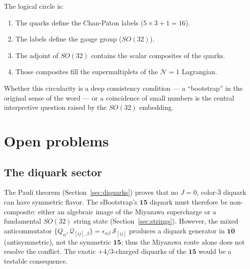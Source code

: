 \documentclass[12pt,a4paper]{article}
\begin{document}
The logical circle is:
\begin{enumerate}
\item The quarks define the Chan-Paton labels ($5 \times 3 + 1 = 16$).
\item The labels define the gauge group ($SO(32)$).
\item The adjoint of $SO(32)$ contains the scalar composites
  of the quarks.
\item Those composites fill the supermultiplets of the
  $\mathcal{N}=1$ Lagrangian.
\end{enumerate}

\noindent
Whether this circularity is a deep consistency condition --- a
``bootstrap'' in the original sense of the word --- or a coincidence of
small numbers is the central interpretive question raised by the
$SO(32)$ embedding.


\section{Open problems}
\label{sec:open}

\subsection{The diquark sector}
The Pauli theorem (Section~\ref{sec:diquarks}) proves that no $J=0$,
color-$\bar{3}$ diquark can have symmetric flavor. The sBootstrap's
$\mathbf{15}$ diquark must therefore be non-composite:
either an algebraic image of the Miyazawa supercharge or a fundamental
$SO(32)$ string state (Section~\ref{sec:strings}). However, the mixed anticommutator
$\{Q_\alpha, \mathcal{Q}_{[ij],\beta}\} = \epsilon_{\alpha\beta}\,
\mathcal{S}_{[ij]}$ produces a diquark generator in
$\overline{\mathbf{10}}$ (antisymmetric), not the symmetric
$\mathbf{15}$; thus the Miyazawa route alone does not resolve the
conflict. The exotic $+4/3$-charged
diquarks of the $\mathbf{15}$ would be a testable consequence.
\end{document}

